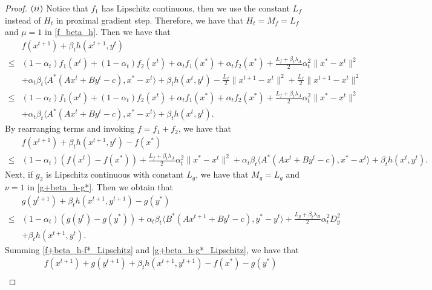 \documentclass{article}
\numberwithin{equation}{section}
\begin{document}
\begin{proof}
    $(\romannumeral2)$ 
    Notice that  $f_1$ has Lipschitz continuous, then we use the constant $L_f$ instead of $H_t$ in proximal 
    gradient step. Therefore,  we have that $H_t = M_f =L_f$ and $\mu=1$ in \eqref{f_beta_h}. Then we have that  
    \begin{align}
        &f(x^{t+1}) +\beta_th(x^{t+1},y^t) \nonumber \\
        \leq & (1-\alpha_t)f_1(x^t)+(1-\alpha_t)f_2(x^t) +\alpha_t f_1(x^*)+\alpha_tf_2(x^*)+\frac{L_f+\beta_t\lambda_A}{2}\alpha_t^2\|x^*-x^t\rVert^2 \nonumber \\
        &+\alpha_t\beta_t\langle A^*(Ax^t+By^t-c), x^*-x^t\rangle + \beta_th(x^t,y^t) -\frac{L_f}{2}\|x^{t+1}-x^t\rVert^2 +\frac{L_f}{2}\|x^{t+1}-x^t\rVert^{2}  \nonumber \\
        \leq & (1-\alpha_t)f_1(x^t)+(1-\alpha_t)f_2(x^t) +\alpha_t f_1(x^*)+\alpha_tf_2(x^*)+\frac{L_f+\beta_t\lambda_A}{2}\alpha_t^2\|x^*-x^t\rVert^2 \nonumber \\
        &+\alpha_t\beta_t\langle A^*(Ax^t+By^t-c), x^*-x^t\rangle + \beta_th(x^t,y^t). \nonumber 
    \end{align}
    By rearranging terms and invoking $f=f_1+f_2$, we have that 
    \begin{align}
        &f(x^{t+1}) +\beta_th(x^{t+1},y^t) -f(x^*) \nonumber \\
        \leq & (1-\alpha_t)(f(x^t)-f(x^*)) +\frac{L_f+\beta_t\lambda_A}{2}\alpha_t^2\|x^*-x^t\rVert^2 
        +\alpha_t\beta_t\langle A^*(Ax^t+By^t-c), x^*-x^t\rangle + \beta_th(x^t,y^t). \label{f+beta_h-f*_Lipschitz}
    \end{align}
    Next, if $g_2$ is Lipschitz continuous with constant $L_g$, we have that $M_g = L_g$ and $\nu=1$ in 
    \eqref{g+beta_h-g*}. Then we obtain that 
    \begin{align}\label{g+beta_h-g*_Lipschitz}
        &g(y^{t+1}) + \beta_th(x^{t+1},y^{t+1}) - g(y^*) \nonumber\\
        \leq& (1-\alpha_t)(g(y^t)-g(y^*))+ \alpha_t\beta_t\langle B^*(Ax^{t+1}+By^t-c), y^*-y^t\rangle + 
        \frac{L_g+\beta_t\lambda_B}{2}\alpha_t^{2}D_y^{2}  \nonumber \\
        &+ \beta_th(x^{t+1},y^t).      
    \end{align}      
    Summing \eqref{f+beta_h-f*_Lipschitz} and \eqref{g+beta_h-g*_Lipschitz}, we have that 
    \begin{align}
        &f(x^{t+1}) +g(y^{t+1}) +\beta_{t}h(x^{t+1},y^{t+1}) -f(x^*) -g(y^*) \nonumber \\

\end{align}
\end{proof}
\end{document}
